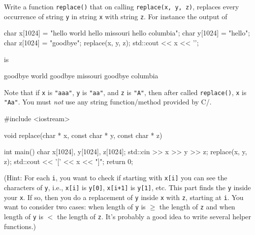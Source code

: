 

\nextq
Write a function \verb!replace()! that
on calling \verb!replace(x, y, z)!,
replaces every occurrence
of string \verb!y! in string \verb!x! with string \verb!z!.
For instance the output of
\begin{console}[fontsize=\small]
char x[1024] = "hello world hello missouri hello columbia";
char y[1024] = "hello";
char z[1024] = "goodbye";
replace(x, y, z);
std::cout << x << '\n';
\end{console}
is
\begin{console}[fontsize=\small]
goodbye world goodbye missouri goodbye columbia
\end{console}
Note that if \verb!x! is \verb!"aaa"!, \verb!y! is \verb!"aa"!,
and \verb!z! is \verb!"A"!, then after called \verb!replace()!,
\verb!x! is \verb!"Aa"!.
You must \textit{not} use any string function/method provided by C/\cpp.
\\
\ANSWER
\begin{answercode}
#include <iostream>

void replace(char * x, const char * y, const char * z)
{
}

int main()
{
    char x[1024], y[1024], z[1024];
    std::cin >> x >> y >> z;
    replace(x, y, z);
    std::cout << '[' << x << "]\n";
    return 0;
}
\end{answercode}

(Hint: For each \verb!i!, you want to check if starting with \verb!x[i]!
you can see the characters of \verb!y!, i.e.,
\verb!x[i]! is \verb!y[0]!,
\verb!x[i+1]! is \verb!y[1]!,
etc.
This part finds the \verb!y! inside your \verb!x!.
If so, then you do a replacement of \verb!y! inside \verb!x! with \verb!z!,
starting at \verb!i!.
You want to consider two cases:
when length of \verb!y! is $\geq$ the length of \verb!z!
and
when length of \verb!y! is $<$ the
length of \verb!z!.
It's probably a good idea to write several helper functions.)


